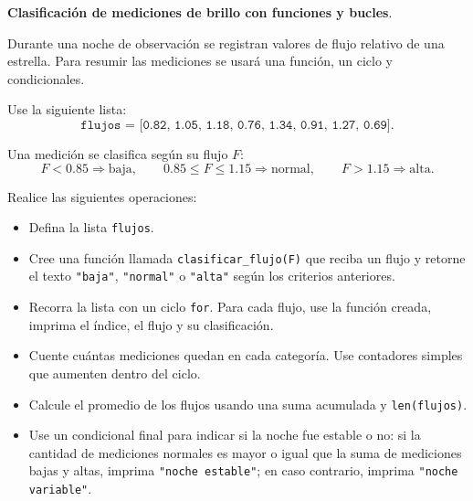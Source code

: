 \providecommand{\Needspace}[1]{}
\Needspace{8\baselineskip}
\item \textbf{Clasificación de mediciones de brillo con funciones y bucles}.
\nopagebreak[4]

\begin{tcolorbox}[colback=blue!2!white,colframe=blue!55!black,title={Enunciado},
                  before skip=3pt,after skip=5pt,boxsep=3pt,top=3pt,bottom=3pt,
                  breakable]
\small
\raggedright
Durante una noche de observación se registran valores de flujo relativo de una
estrella. Para resumir las mediciones se usará una función, un ciclo y
condicionales.

Use la siguiente lista:
\[
\texttt{flujos = [0.82,\ 1.05,\ 1.18,\ 0.76,\ 1.34,\ 0.91,\ 1.27,\ 0.69]}.
\]

Una medición se clasifica según su flujo \(F\):
\[
F < 0{.}85 \Longrightarrow \text{baja},
\qquad
0{.}85 \leq F \leq 1{.}15 \Longrightarrow \text{normal},
\qquad
F > 1{.}15 \Longrightarrow \text{alta}.
\]

Realice las siguientes operaciones:

\begin{itemize}
\setlength{\topsep}{4pt}
\setlength{\itemsep}{3pt}
\setlength{\parsep}{0pt}
\item[(a)] Defina la lista \texttt{flujos}.
\item[(b)] Cree una función llamada \texttt{clasificar\_flujo(F)} que reciba un
flujo y retorne el texto \texttt{"baja"}, \texttt{"normal"} o \texttt{"alta"}
según los criterios anteriores.
\item[(c)] Recorra la lista con un ciclo \texttt{for}. Para cada flujo, use la
función creada, imprima el índice, el flujo y su clasificación.
\item[(d)] Cuente cuántas mediciones quedan en cada categoría. Use contadores
simples que aumenten dentro del ciclo.
\item[(e)] Calcule el promedio de los flujos usando una suma acumulada y
\texttt{len(flujos)}.
\item[(f)] Use un condicional final para indicar si la noche fue estable o no:
si la cantidad de mediciones normales es mayor o igual que la suma de mediciones
bajas y altas, imprima \texttt{"noche estable"}; en caso contrario, imprima
\texttt{"noche variable"}.
\end{itemize}
\end{tcolorbox}

